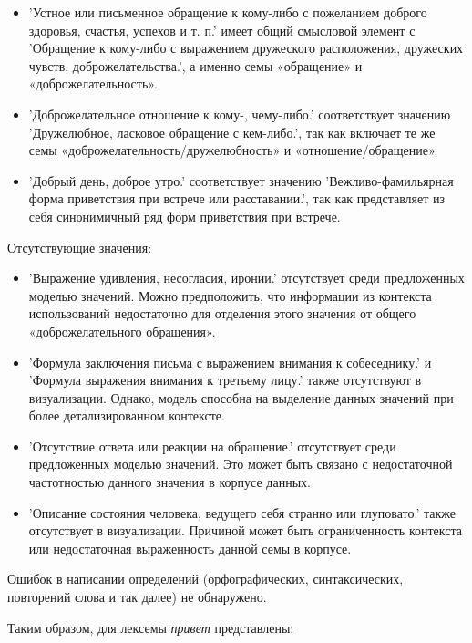 \begin{itemize}
    \item ’Устное или письменное обращение к кому-либо с пожеланием доброго здоровья, счастья, успехов и т. п.’
имеет общий смысловой элемент с ’Обращение к кому-либо с выражением дружеского расположения,
дружеских чувств, доброжелательства.’, а именно семы «обращение» и «доброжелательность».

    \item ’Доброжелательное отношение к кому-, чему-либо.’ соответствует значению
’Дружелюбное, ласковое обращение с кем-либо.’,
так как включает те же семы «доброжелательность/дружелюбность» и «отношение/обращение».

    \item ’Добрый день, доброе утро.’ соответствует значению
’Вежливо-фамильярная форма приветствия при встрече или расставании.’,
так как представляет из себя синонимичный ряд форм приветствия при встрече.
\end{itemize}

Отсутствующие значения:
\begin{itemize}
    \item ’Выражение удивления, несогласия, иронии.’ отсутствует среди предложенных моделью значений.
    Можно предположить, что информации из контекста использований недостаточно для отделения
    этого значения от общего «доброжелательного обращения».

    \item ’Формула заключения письма с выражением внимания к собеседнику.’ и ’Формула выражения внимания к третьему лицу.’ также отсутствуют в визуализации.
    Однако, модель способна на выделение данных значений при более детализированном контексте.

    \item ’Отсутствие ответа или реакции на обращение.’ отсутствует среди предложенных моделью значений.
    Это может быть связано с недостаточной частотностью данного значения в корпусе данных.

    \item ’Описание состояния человека, ведущего себя странно или глуповато.’ также отсутствует в визуализации.
    Причиной может быть ограниченность контекста или недостаточная выраженность данной семы в корпусе.
\end{itemize}

Ошибок в написании определений (орфографических, синтаксических, повторений слова и так далее) не обнаружено.

Таким образом, для лексемы \textit{привет} представлены:

